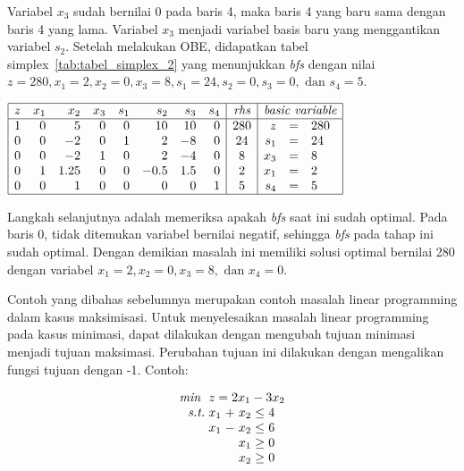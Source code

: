 Variabel \(x_3\) sudah bernilai 0 pada baris 4, maka baris 4 yang baru sama dengan baris 4 yang lama. Variabel \(x_3\) menjadi variabel basis baru yang menggantikan variabel \(s_2\). Setelah melakukan OBE, didapatkan tabel simplex~\ref{tab:tabel_simplex_2} yang menunjukkan \textit{bfs} dengan nilai \(z=280, x_1=2, x_2=0, x_3=8, s_1=24, s_2=0, s_3=0, \text{ dan } s_4=5\).

\begin{center}
	\label{tab:tabel_simplex_2}
	$
	\begin{array}{|r r r r r r r r|c|r c l|}
		\hline
		z & x_1 & x_2 & x_3 & s_1 & s_2 & s_3 & s_4 & \textit{rhs} & \multicolumn{3}{c|}{\textit{basic variable}}\\
		\hline
		1 & 0 & 5 & 0 & 0 & 10 & 10 & 0 & 280 & z & = & 280\\
		0 & 0 & -2 & 0 & 1 & 2 & -8 & 0 & 24 & s_1 & = & 24\\
		0 & 0 & -2 & 1 & 0 & 2 & -4 & 0 & 8 & x_3 & = & 8\\
		0 & 1 & 1.25 & 0 & 0 & -0.5 & 1.5 & 0 & 2 & x_1 & = & 2\\
		0 & 0 & 1 & 0 & 0 & 0 & 0 & 1 & 5 & s_4 & = & 5\\
		\hline
	\end{array}
	$
\end{center}

Langkah selanjutnya adalah memeriksa apakah \textit{bfs} saat ini sudah optimal. Pada baris 0, tidak ditemukan variabel bernilai negatif, sehingga \textit{bfs} pada tahap ini sudah optimal. Dengan demikian masalah ini memiliki solusi optimal bernilai 280 dengan variabel \(x_1=2, x_2=0, x_3=8, \text{ dan } x_4 = 0\).

Contoh yang dibahas sebelumnya merupakan contoh masalah linear programming dalam kasus maksimisasi. Untuk menyelesaikan masalah linear programming pada kasus minimasi, dapat dilakukan dengan mengubah tujuan minimasi menjadi tujuan maksimasi. Perubahan tujuan ini dilakukan dengan mengalikan fungsi tujuan dengan -1. Contoh:

\begin{equation*}
	\setlength\arraycolsep{1.5pt}
	\begin{array}{r r c r c l}
		\textit{min } &\multicolumn{5}{l}{z = 2x_1 - 3x_2}\\
		\textit{s.t.} &x_1 &+ &x_2 &\leq &4\\
		&x_1 &- &x_2 &\leq &6\\
		&&&x_1 &\geq &0\\
		&&&x_2 &\geq &0\\
	\end{array}
\end{equation*}


